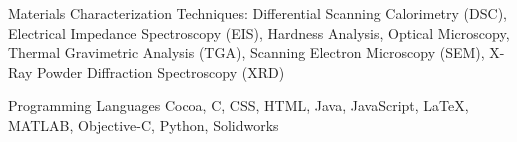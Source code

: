 \documentclass[10pt,letterpaper]{article}
\newenvironment{indentsection}[1]%
{\begin{list}{}%
  {\setlength{\leftmargin}{#1}}%
  \item[]%
}
{\end{list}}
\newcommand{\CPP}
{C\nolinebreak[4]\hspace{-.05em}\raisebox{.22ex}{\footnotesize\bf ++}}
\begin{document}
\begin{indentsection}{\parindent}
\begin{description*}
  \item[Materials Characterization Techniques:]
  Differential Scanning Calorimetry (DSC), Electrical Impedance Spectroscopy (EIS), Hardness Analysis, Optical Microscopy, Thermal Gravimetric Analysis (TGA), Scanning Electron Microscopy (SEM), X-Ray Powder Diffraction Spectroscopy (XRD)
  \item[Programming Languages]
  Cocoa, \CPP, CSS, HTML, Java, JavaScript, \LaTeX, MATLAB, Objective-C, Python, Solidworks

\end{description*}
\end{indentsection}
\end{document}
